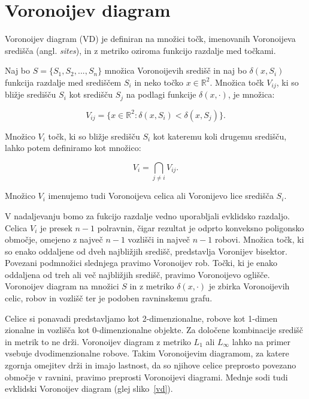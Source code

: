 \documentclass[a4paper, 12pt]{book}
\begin{document}
\section{Voronoijev diagram}
Voronoijev diagram (VD) je definiran na množici točk, imenovanih Voronoijeva središča (angl. \textit{sites}), in z metriko oziroma funkcijo razdalje med točkami.

Naj bo $S = \{S_1,S_2,...,S_n\}$ množica Voronoijevih središč in naj bo $\delta(x,S_i)$ funkcija razdalje med središčem $S_i$ in neko točko $x \in \mathbb{R}^2$. Množica točk $V_{ij}$, ki so bližje središču $S_i$ kot središču $S_j$ na podlagi funkcije $\delta(x,\cdot)$, je množica:

\begin{equation*}
V_{ij} = \{x \in \mathbb{R}^2: \delta(x,S_i) < \delta(x,S_j)\}. 
\end{equation*}

Množico $V_i$ točk, ki so bližje središču $S_i$ kot kateremu koli drugemu središču, lahko potem definiramo kot množico:

\begin{equation*}
V_i = \bigcap_{j \neq i} V_{ij} .
\end{equation*}

Množico $V_i$ imenujemo tudi Voronoijeva celica ali Voronijevo lice središča $S_i$. 

V nadaljevanju bomo za fukcijo razdalje vedno uporabljali evklidsko razdaljo. Celica $V_i$ je presek $n-1$ polravnin, čigar rezultat je odprto konveksno poligonsko območje, omejeno z največ $n-1$ vozlišči in največ $n-1$ robovi. Množica točk, ki so enako oddaljene od dveh najbližjih središč, predstavlja Voronijev bisektor. Povezani podmnožici slednjega pravimo Voronoijev rob. Točki, ki je enako oddaljena od treh ali več najbližjih središč, pravimo Voronoijevo oglišče. Voronoijev diagram na množici $S$ in z metriko $\delta(x,\cdot)$ je zbirka Voronoijevih celic, robov in vozlišč ter je podoben ravninskemu grafu.

Celice si ponavadi predstavljamo kot 2-dimenzionalne, robove kot 1-dimen\- zionalne in vozlišča kot 0-dimenzionalne objekte. Za določene kombinacije središč in metrik to ne drži. Voronoijev diagram z metriko $L_1$ ali $L_{\infty}$ lahko na primer vsebuje dvodimenzionalne robove. Takim Voronoijevim diagramom, za katere zgornja omejitev drži in imajo lastnost, da so njihove celice preprosto povezano območje v ravnini, pravimo preprosti Voronoijevi diagrami. Mednje sodi tudi evklidski Voronoijev diagram (glej sliko~\ref{vd}).
\end{document}
